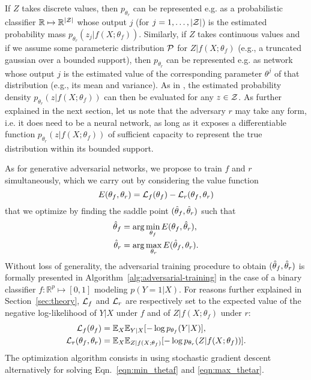 \documentclass[twocolumn,superscriptaddress,aps]{revtex4-1}
\theoremstyle{plain}
\begin{document}
If $Z$ takes discrete values, then $p_{\theta_r}$ can be represented e.g. as a
probabilistic classifier $\mathbb{R} \mapsto \mathbb{R}^{|{\cal Z|}}$ whose
output $j$ (for $j=1, \dots, |{\cal Z}|$) is the estimated probability mass
$p_{\theta_r}(z_j|f(X;\theta_f))$. Similarly, if $Z$ takes continuous values and
if we assume some parameteric distribution ${\cal P}$ for $Z|f(X;\theta_f)$ (e.g., a
truncated gaussian over a bounded support), then $p_{\theta_r}$ can be
represented e.g. as network whose output $j$ is the estimated value of the
corresponding parameter $\theta^j$ of that distribution (e.g., its mean and variance). As
in \citep{nix1994estimating}, the estimated probability density
$p_{\theta_r}(z|f(X;\theta_f))$ can then be evaluated for any $z \in {\cal Z}$.
As further explained in the next section, let us note that the adversary $r$ may
take any form, i.e. it does need to be a neural network, as long as it exposes a
differentiable function $p_{\theta_r}(z|f(X;\theta_f))$ of sufficient capacity
to represent the true distribution within its bounded support.

As for generative adversarial networks, we propose to
train $f$ and $r$ simultaneously, which we carry out by considering
the value function
\begin{equation}
    E(\theta_f, \theta_r) = {\cal L}_f(\theta_f) - {\cal L}_r(\theta_f, \theta_r)
\end{equation}
that we optimize by finding the saddle point $(\smash{\hat\theta_f}, \smash{\hat\theta_r})$ such that
\begin{align}
    \smash{\hat\theta_f} &= \arg \min_{\theta_f} E(\theta_f, \smash{\hat\theta_r}), \label{eqn:min_thetaf} \\
    \smash{\hat\theta_r} &= \arg \max_{\theta_r} E(\smash{\hat\theta_f}, \theta_r) \label{eqn:max_thetar}.
\end{align}
Without loss of generality, the adversarial training procedure to obtain
$(\smash{\hat\theta_f}, \smash{\hat\theta_r})$ is formally presented in
Algorithm~\ref{alg:adversarial-training} in the case of a binary classifier $f :
\mathbb{R}^p \mapsto [0,1]$ modeling $p(Y=1|X)$. For reasons further explained
in Section~\ref{sec:theory}, ${\cal L}_f$ and ${\cal L}_r$  are respectively set to the
expected value of the
negative log-likelihood of $Y|X$ under $f$ and of $Z|f(X;\theta_f)$ under
$r$:
\begin{align}
    {\cal L}_f(\theta_f) &= \mathbb{E}_{X} \mathbb{E}_{Y|X} [ -\log p_{\theta_f} (Y|X) ], \\
    {\cal L}_r(\theta_f, \theta_r) &= \mathbb{E}_{X}  \mathbb{E}_{Z|f(X;\theta_f)} [-\log p_{\theta_r} (Z|f(X;\theta_f))].
\end{align}
The optimization algorithm consists in using stochastic gradient descent
alternatively for solving Eqn.~\ref{eqn:min_thetaf} and \ref{eqn:max_thetar}.
\end{document}
